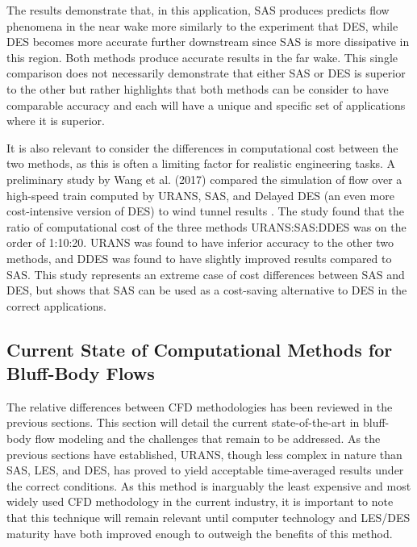 \documentclass[journal]{new-aiaa}
\begin{document}
The results demonstrate that, in this application, SAS produces predicts flow phenomena in the near wake more similarly to the experiment that DES, while DES becomes more accurate further downstream since SAS is more dissipative in this region. Both methods produce accurate results in the far wake. This single comparison does not necessarily demonstrate that either SAS or DES is superior to the other but rather highlights that both methods can be consider to have comparable accuracy and each will have a unique and specific set of applications where it is superior.






It is also relevant to consider the differences in computational cost between the two methods, as this is often a limiting factor for realistic engineering tasks. A preliminary study by Wang et al. (2017) compared the simulation of flow over a high-speed train computed by URANS, SAS, and Delayed DES (an even more cost-intensive version of DES) to wind tunnel results \cite{wang2017performance}. The study found that the ratio of computational cost of the three methods URANS:SAS:DDES was on the order of 1:10:20. URANS was found to have inferior accuracy to the other two methods, and DDES was found to have slightly improved results compared to SAS. This study represents an extreme case of cost differences between SAS and DES, but shows that SAS can be used as a cost-saving alternative to DES in the correct applications.
















\subsection{Current State of Computational Methods for Bluff-Body Flows} \label{subsec:currentstatenumeric}


The relative differences between CFD methodologies has been reviewed in the previous sections. This section will detail the current state-of-the-art in bluff-body flow modeling and the challenges that remain to be addressed. As the previous sections have established, URANS, though less complex in nature than SAS, LES, and DES, has proved to yield acceptable time-averaged results under the correct conditions. As this method is inarguably the least expensive and most widely used CFD methodology in the current industry, it is important to note that this technique will remain relevant until computer technology and LES/DES maturity have both improved enough to outweigh the benefits of this method.
\end{document}
